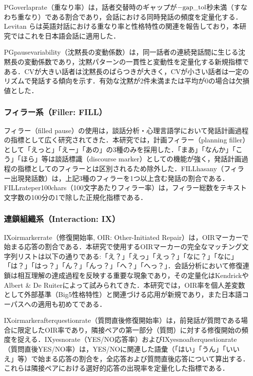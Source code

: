 \documentclass[dvipdfmx,11pt,a4paper]{bxjsarticle}
\renewcommand{\_}{\paperorigunderscore\allowbreak}%
\begin{document}
PG\_overlap\_rate（重なり率）は，話者交替時のギャップが$-\text{gap\_tol}$秒未満（すなわち重なり）である割合であり，会話における同時発話の頻度を定量化する．Levitan ら\cite{levitan2012}は英語対話における重なり率と性格特性の関連を報告しており，本研究ではこれを日本語会話に適用した．

PG\_pause\_variability（沈黙長の変動係数）は，同一話者の連続発話間に生じる沈黙長の変動係数であり，沈黙パターンの一貫性と変動性を定量化する新規指標である．CVが大きい話者は沈黙長のばらつきが大きく，CVが小さい話者は一定のリズムで発話する傾向を示す．有効な沈黙が2件未満または平均が0の場合は欠損値とした．

\subsubsection{フィラー系（Filler: FILL）}
フィラー（filled pause）の使用は，談話分析・心理言語学において発話計画過程の指標として広く研究されてきた\cite{clark1996,watanabe2003}．本研究では，計画フィラー（planning filler）として「えっと」「えー」「あの」の3種のみを採用した．「まあ」「なんか」「こう」「ほら」等は談話標識（discourse marker）としての機能が強く，発話計画過程の指標としてのフィラーとは区別されるため除外した\cite{watanabe2003}．FILL\_has\_any（フィラー出現発話数）は，上記3種のフィラーを1つ以上含む発話の割合である．FILL\_rate\_per\_100chars（100文字あたりフィラー率）は，フィラー総数をテキスト文字数の100分の1で除した正規化指標である．

\subsubsection{連鎖組織系（Interaction: IX）}
IX\_oirmarker\_rate（修復開始率, OIR: Other-Initiated Repair）は，OIRマーカーで始まる応答の割合である．本研究で使用するOIRマーカーの完全なマッチング文字列リストは以下の通りである:「え？」「えっ」「えっ？」「なに？」「なに」「は？」「はっ？」「ん？」「んっ？」「へ？」「へっ？」．会話分析において修復連鎖は相互理解の達成過程を反映する重要な現象であり\cite{schegloff1977}，その定量化はKendrick\cite{kendrick2015}やAlbert \& De Ruiter\cite{albert2018}によって試みられてきた．本研究では，OIR率を個人差変数として外部基準（Big5性格特性）と関連づける応用が新規であり，また日本語コーパスへの適用も初めてである．

IX\_oirmarker\_after\_question\_rate（質問直後修復開始率）は，前発話が質問である場合に限定したOIR率であり，隣接ペアの第一部分（質問）に対する修復開始の頻度を捉える．IX\_yesno\_rate（YES/NO応答率）およびIX\_yesno\_after\_question\_rate（質問直後YES/NO率）は，YES/NOに関連した語彙（「はい」「うん」「いいえ」等）で始まる応答の割合を，全応答および質問直後応答について算出する．これらは隣接ペアにおける選好的応答の出現率を定量化した指標である．
\end{document}

